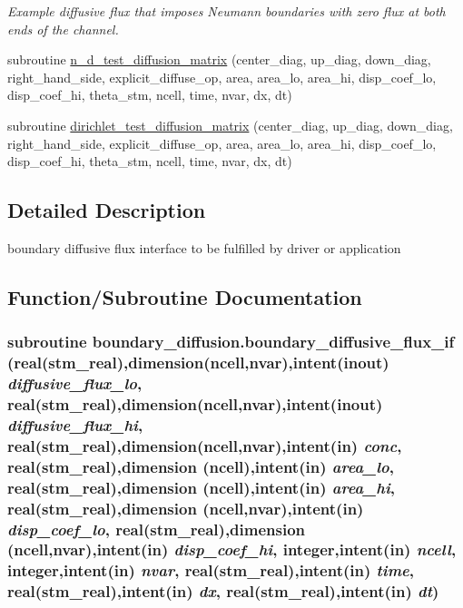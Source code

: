 \begin{CompactItemize}
\begin{CompactList}\small\item\em Example diffusive flux that imposes Neumann boundaries with zero flux at both ends of the channel. \item\end{CompactList}\item 
subroutine \hyperlink{a00054_c775cdd8eb15a9342ab20bf9e0cbe78a}{n\_\-d\_\-test\_\-diffusion\_\-matrix} (center\_\-diag, up\_\-diag, down\_\-diag, right\_\-hand\_\-side, explicit\_\-diffuse\_\-op, area, area\_\-lo, area\_\-hi, disp\_\-coef\_\-lo, disp\_\-coef\_\-hi, theta\_\-stm, ncell, time, nvar, dx, dt)
\item 
subroutine \hyperlink{a00054_97261dd167325efeaa30024f80daf5c7}{dirichlet\_\-test\_\-diffusion\_\-matrix} (center\_\-diag, up\_\-diag, down\_\-diag, right\_\-hand\_\-side, explicit\_\-diffuse\_\-op, area, area\_\-lo, area\_\-hi, disp\_\-coef\_\-lo, disp\_\-coef\_\-hi, theta\_\-stm, ncell, time, nvar, dx, dt)
\end{CompactItemize}


\subsection{Detailed Description}
boundary diffusive flux interface to be fulfilled by driver or application 



\subsection{Function/Subroutine Documentation}
\hypertarget{a00054_4f45f5144ae10b697903971da3b2df1b}{
\subsubsection[{boundary\_\-diffusive\_\-flux\_\-if}]{\setlength{\rightskip}{0pt plus 5cm}subroutine boundary\_\-diffusion.boundary\_\-diffusive\_\-flux\_\-if (real(stm\_\-real),dimension(ncell,nvar),intent(inout) {\em diffusive\_\-flux\_\-lo}, \/  real(stm\_\-real),dimension(ncell,nvar),intent(inout) {\em diffusive\_\-flux\_\-hi}, \/  real(stm\_\-real),dimension(ncell,nvar),intent(in) {\em conc}, \/  real(stm\_\-real),dimension         (ncell),intent(in) {\em area\_\-lo}, \/  real(stm\_\-real),dimension         (ncell),intent(in) {\em area\_\-hi}, \/  real(stm\_\-real),dimension (ncell,nvar),intent(in) {\em disp\_\-coef\_\-lo}, \/  real(stm\_\-real),dimension (ncell,nvar),intent(in) {\em disp\_\-coef\_\-hi}, \/  integer,intent(in) {\em ncell}, \/  integer,intent(in) {\em nvar}, \/  real(stm\_\-real),intent(in) {\em time}, \/  real(stm\_\-real),intent(in) {\em dx}, \/  real(stm\_\-real),intent(in) {\em dt})}}
\label{a00054_4f45f5144ae10b697903971da3b2df1b}


